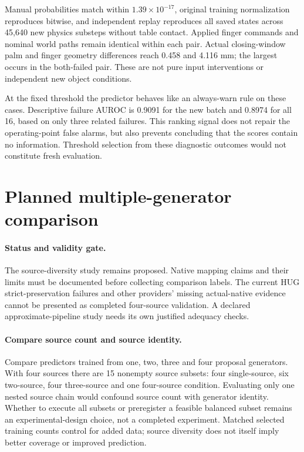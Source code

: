 \documentclass[10pt,letterpaper]{article}
\begin{document}
Manual probabilities match within $1.39\times10^{-17}$, original training
normalization reproduces bitwise, and independent replay reproduces all saved
states across 45,640 new physics substeps without table contact. Applied finger
commands and nominal world paths remain identical within each pair. Actual
closing-window palm and finger geometry differences reach 0.458 and 4.116 mm;
the largest occurs in the both-failed pair. These are not pure input
interventions or independent new object conditions.

At the fixed threshold the predictor behaves like an always-warn rule on these
cases. Descriptive failure AUROC is 0.9091 for the new batch and 0.8974 for all
16, based on only three related failures. This ranking signal does not repair
the operating-point false alarms, but also prevents concluding that the scores
contain no information. Threshold selection from these diagnostic outcomes
would not constitute fresh evaluation.

\section{Planned multiple-generator comparison}
\paragraph{Status and validity gate.}
The source-diversity study remains proposed. Native mapping claims and their
limits must be documented before collecting comparison labels. The current
HUG strict-preservation failures and other providers' missing actual-native
evidence cannot be presented as completed four-source validation. A declared
approximate-pipeline study needs its own justified adequacy checks.

\paragraph{Compare source count and source identity.}
Compare predictors trained from one, two, three and four proposal generators.
With four sources there are 15 nonempty source subsets: four single-source,
six two-source, four three-source and one four-source condition. Evaluating
only one nested source chain would confound source count with generator identity.
Whether to execute all subsets or preregister a feasible balanced subset remains
an experimental-design choice, not a completed experiment. Matched selected
training counts control for added data; source diversity does not itself imply
better coverage or improved prediction.
\end{document}
